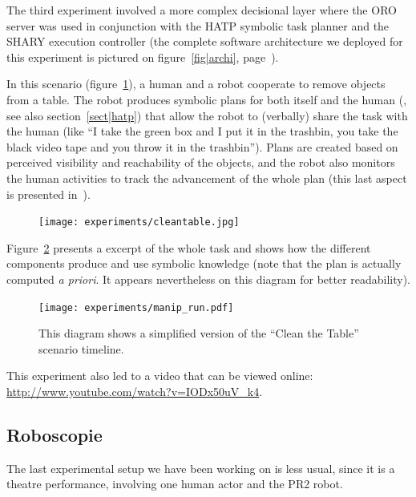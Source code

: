 The third experiment involved a more complex decisional layer where the ORO
server was used in conjunction with the HATP symbolic task planner and the
SHARY execution controller (the complete software architecture we deployed for
this experiment is pictured on figure~\ref{fig|archi},
page~\pageref{fig|archi}).

In this scenario (figure~\ref{fig|cleantable-video}), a human and a robot
cooperate to remove objects from a table. The robot produces symbolic plans for
both itself and the human (\cite{Alami2011}, see also section~\ref{sect|hatp})
that allow the robot to (verbally) share the task with the human (like ``I take
the green box and I put it in the trashbin, you take the black video tape and
you throw it in the trashbin''). Plans are created based on perceived
visibility and reachability of the objects, and the robot also monitors the
human activities to track the advancement of the whole plan (this last aspect
is presented in~\cite{Warnier2012}).

\begin{figure}
    \centering
    \texttt{[image: experiments/cleantable.jpg]}
    \caption{}
    \label{fig|cleantable-video}
\end{figure}


Figure~\ref{fig|cleantable-timeline} presents a excerpt of the whole task and
shows how the different components produce and use symbolic knowledge (note
that the plan is actually computed {\it a priori}. It appears nevertheless on
this diagram for better readability).

\begin{figure}
    \centering
    \texttt{[image: experiments/manip\_run.pdf]}

    \caption{This diagram shows a simplified version of the ``Clean the Table'' scenario timeline.}

    \label{fig|cleantable-timeline}
\end{figure}


This experiment also led to a video that can be viewed online:
\url{http://www.youtube.com/watch?v=IODx50uV_k4}.


\subsection{Roboscopie}
\label{sect|roboscopie}

The last experimental setup we have been working on is less usual, since it is
a theatre performance, involving one human actor and the PR2 robot.

